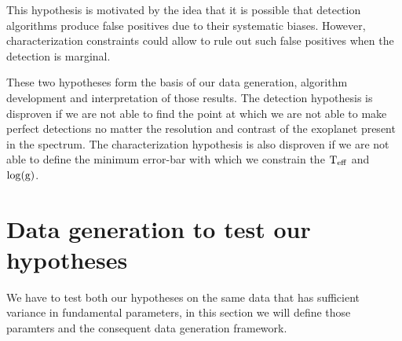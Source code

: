 This hypothesis is motivated by the idea that it is possible that detection algorithms produce false positives due to their systematic biases. 
However, characterization constraints could allow to rule out such false positives when the detection is marginal.

These two hypotheses form the basis of our data generation, algorithm development and interpretation of those results. 
The detection hypothesis is disproven if we are not able to find the point at which we are not able to make perfect detections no matter the resolution and contrast of the exoplanet present in the spectrum.
The characterization hypothesis is also disproven if we are not able to define the minimum error-bar with which we constrain the $\rm{T_{eff}}$ and $\rm{\log(g)}$.

\section{Data generation to test our hypotheses}
We have to test both our hypotheses on the same data that has sufficient variance in fundamental parameters, in this section we will define those paramters and the consequent data generation framework.
